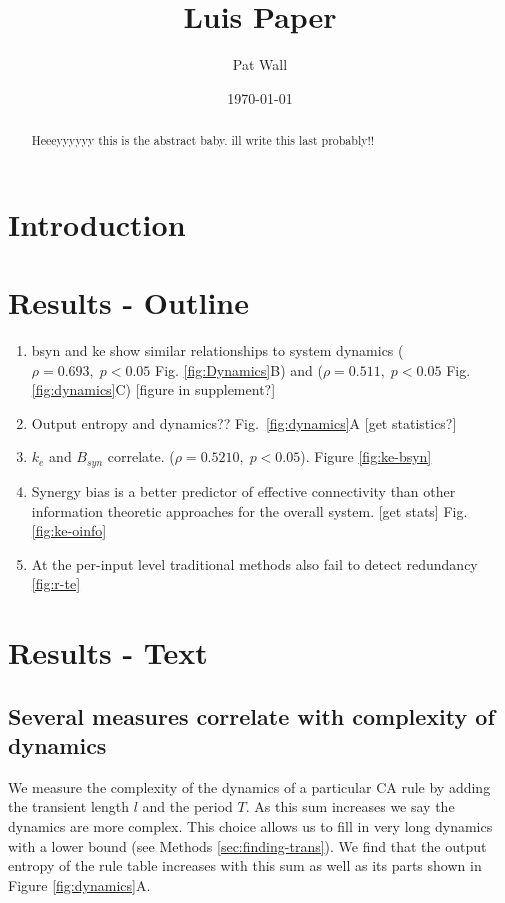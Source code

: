 \documentclass[12 pt]{article}
\title{Luis Paper}
\author{Pat Wall}
\date{\today}
\newcommand{\figref}[1]{Fig.~\ref{fig:#1}}
\begin{document}
\maketitle

\begin{abstract}
    Heeeyyyyyy this is the abstract baby. ill write this last probably!!
\end{abstract}

\section{Introduction}

\section{Results - Outline}
\begin{enumerate}
    \item bsyn and ke show similar relationships to system dynamics 
    ($\rho=0.693, \; p<0.05$ Fig. \ref{fig:Dynamics}B) and 
    ($\rho=0.511, \; p<0.05$ Fig. \ref{fig:dynamics}C) [figure in supplement?]
    \item Output entropy and dynamics?? \figref{dynamics}A [get statistics?]
    \item $k_e$ and $B_{syn}$ correlate. ($\rho=0.5210, \; p < 0.05$). Figure \ref{fig:ke-bsyn}
    \item Synergy bias is a better predictor of effective connectivity than
          other information theoretic approaches for the overall system. [get stats]
          Fig. \ref{fig:ke-oinfo}
    \item At the per-input level traditional methods also fail to detect redundancy \ref{fig:r-te}
\end{enumerate}

\section{Results - Text}

\subsection{Several measures correlate with complexity of dynamics}

We measure the complexity of the dynamics of a particular CA rule by adding the
transient length $l$ and the period $T$. As this sum increases we say the
dynamics are more complex. This choice allows us to fill in very long dynamics
with a lower bound (see Methods \ref{sec:finding-trans}). We find that the
output entropy of the rule table increases with this sum as well as its parts 
shown in Figure \ref{fig:dynamics}A. 
\end{document}
